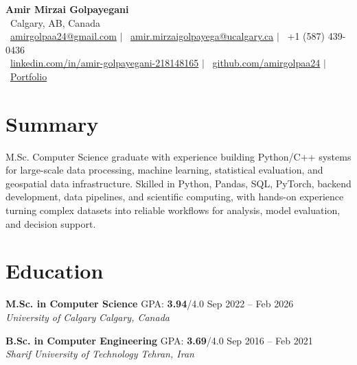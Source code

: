 \documentclass[a4paper,10pt]{article}
\newcommand{\resumeEducationSubheading}[5]{
    \textbf{#1} \hfill #2 \hfill #3 \\
    \textit{#4} \hfill \textit{#5}
}
\begin{document}

\begin{center}
    {\LARGE \textbf{Amir Mirzai Golpayegani}} \\[0.25em]
    \faMapMarker*~Calgary, AB, Canada \\[0.25em]
    \faEnvelope~\href{mailto:amirgolpaa24@gmail.com}{amirgolpaa24@gmail.com}
    $|$
    \faEnvelope~\href{mailto:amir.mirzaigolpayega@ucalgary.ca}{amir.mirzaigolpayega@ucalgary.ca}
    $|$
    \faPhone*~+1 (587) 439-0436 \\[0.25em]
    \faLinkedin~\href{https://linkedin.com/in/amir-golpayegani-218148165}{linkedin.com/in/amir-golpayegani-218148165}
    $|$
    \faGithub~\href{https://github.com/amirgolpaa24}{github.com/amirgolpaa24}
    $|$
    \faGlobe~\href{https://amir-portfolio-navy.vercel.app/}{Portfolio}
\end{center}


\section*{Summary}

M.Sc. Computer Science graduate with experience building Python/C++ systems for large-scale data processing, machine learning, statistical evaluation, and geospatial data infrastructure. Skilled in Python, Pandas, SQL, PyTorch, backend development, data pipelines, and scientific computing, with hands-on experience turning complex datasets into reliable workflows for analysis, model evaluation, and decision support.


\section*{Education}

\resumeEducationSubheading
{M.Sc. in Computer Science}
{GPA: \textbf{3.94}/4.0}
{Sep 2022 -- Feb 2026}
{University of Calgary}
{Calgary, Canada}

\vspace{0.35em}

\resumeEducationSubheading
{B.Sc. in Computer Engineering}
{GPA: \textbf{3.69}/4.0}
{Sep 2016 -- Feb 2021}
{Sharif University of Technology}
{Tehran, Iran}

\end{document}
